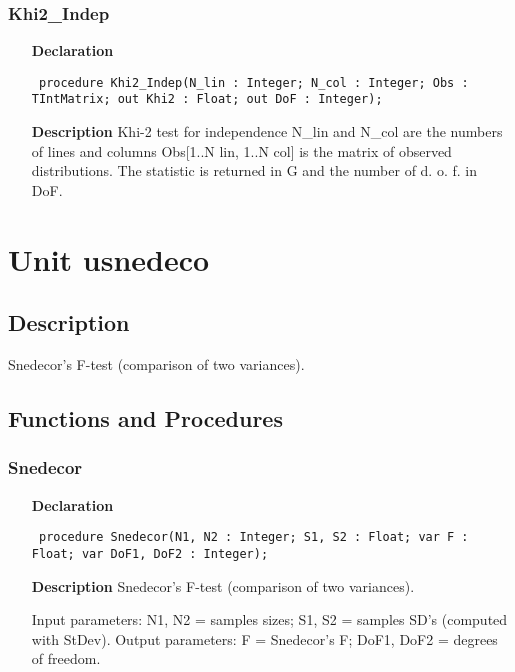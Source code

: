 \documentclass[12pt,a4paper,oneside]{report}
\newcommand{\declarationitem}[1]{\textbf{#1}}
\newcommand{\descriptiontitle}[1]{\textbf{#1}}
\newcommand{\code}[1]{\texttt{#1}}
\begin{document}
\subsubsection{Khi2{\_}Indep}
\label{ukhi2-Khi2_Indep}
\begin{itemize}\item[\declarationitem{Declaration}\hfill]
	\begin{flushleft}
		\code{
			procedure Khi2{\_}Indep(N{\_}lin : Integer; N{\_}col : Integer; Obs : TIntMatrix; out Khi2 : Float; out DoF : Integer);}
	\end{flushleft}
	\item[\descriptiontitle{Description}]
	Khi{-}2 test for independence N{\_}lin and N{\_}col are the numbers of lines and columns Obs[1..N lin, 1..N col] is the matrix of observed distributions. The statistic is returned in G and the number of d. o. f. in DoF.
\end{itemize}

\section{Unit usnedeco}
\label{usnedeco}
\subsection{Description}
Snedecor's F{-}test (comparison of two variances). 
\subsection{Functions and Procedures}
\subsubsection{Snedecor}
\label{usnedeco-Snedecor}
\begin{itemize}\item[\declarationitem{Declaration}\hfill]
	\begin{flushleft}
		\code{
			procedure Snedecor(N1, N2 : Integer; S1, S2 : Float; var F : Float; var DoF1, DoF2 : Integer);}
	\end{flushleft}
	\par
	\item[\descriptiontitle{Description}]
	Snedecor's F{-}test (comparison of two variances).
	
	Input parameters: N1, N2 = samples sizes; S1, S2 = samples SD's (computed with StDev). Output parameters: F = Snedecor's F; DoF1, DoF2 = degrees of freedom.
\end{itemize}
\end{document}
